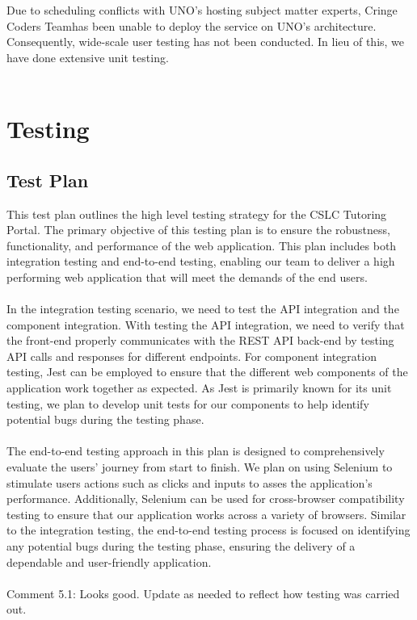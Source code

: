 \documentclass[oneside,openany,obeyspaces]{book}
\newcommand\tab[1][1cm]{\hspace*{#1}}
\newcommand\TeamName{Cringe Coders Team}
\begin{document}
\begin{flushleft}
    \tab Due to scheduling conflicts with UNO's hosting subject matter experts, \TeamName has been unable to deploy the service on UNO's architecture. Consequently, wide-scale user testing has not been conducted. In lieu of this, we have done extensive unit testing.\\~\\




    \chapter{Testing}

    \section{Test Plan}
    \tab This test plan outlines the high level testing strategy for the CSLC Tutoring Portal. The primary objective of this testing plan is to ensure the robustness, functionality, and performance of the web application. This plan includes both integration testing and end-to-end testing, enabling our team to deliver a high performing web application that will meet the demands of the end users.\\~\\

    \tab In the integration testing scenario, we need to test the API integration and the component integration. With testing the API integration, we need to verify that the front-end properly communicates with the REST API back-end by testing API calls and responses for different endpoints. For component integration testing, Jest can be employed to ensure that the different web components of the application work together as expected. As Jest is primarily known for its unit testing, we plan to develop unit tests for our components to help identify potential bugs during the testing phase.\\~\\

    \tab The end-to-end testing approach in this plan is designed to comprehensively evaluate the users' journey from start to finish. We plan on using Selenium to stimulate users actions such as clicks and inputs to asses the application's performance. Additionally, Selenium can be used for cross-browser compatibility testing to ensure that our application works across a variety of browsers. Similar to the integration testing, the end-to-end testing process is focused on identifying any potential bugs during the testing phase, ensuring the delivery of a dependable and user-friendly application.\\~\\
    {\color{red}Comment 5.1: Looks good. Update as needed to reflect how testing was carried out.\\~\\}



\end{flushleft}
\end{document}

